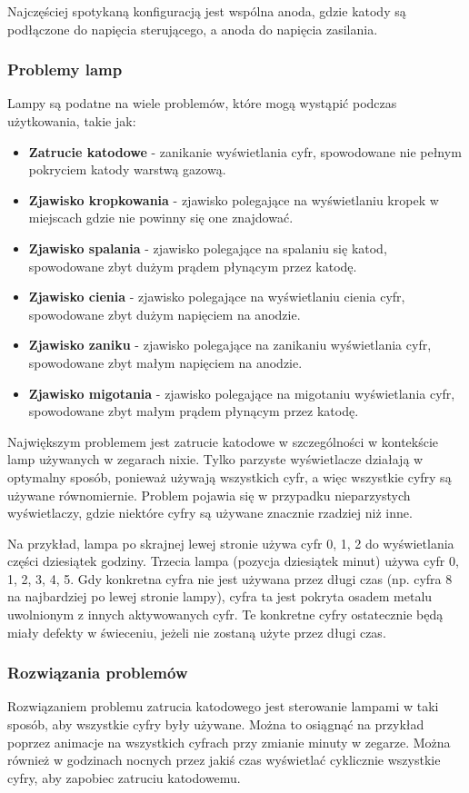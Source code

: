 \documentclass[../main.tex]{subfiles}
\begin{document}
Najczęściej spotykaną konfiguracją jest wspólna anoda, gdzie katody są podłączone do napięcia sterującego, a anoda do napięcia zasilania.

\subsubsection{Problemy lamp}

Lampy są podatne na wiele problemów, które mogą wystąpić podczas użytkowania, takie jak:
\begin{itemize}
  \item \textbf{Zatrucie katodowe} - zanikanie wyświetlania cyfr, spowodowane nie pełnym pokryciem katody warstwą gazową.
  \item \textbf{Zjawisko kropkowania} - zjawisko polegające na wyświetlaniu kropek w miejscach gdzie nie powinny się one znajdować.
  \item \textbf{Zjawisko spalania} - zjawisko polegające na spalaniu się katod, spowodowane zbyt dużym prądem płynącym przez katodę.
  \item \textbf{Zjawisko cienia} - zjawisko polegające na wyświetlaniu cienia cyfr, spowodowane zbyt dużym napięciem na anodzie.
  \item \textbf{Zjawisko zaniku} - zjawisko polegające na zanikaniu wyświetlania cyfr, spowodowane zbyt małym napięciem na anodzie.
  \item \textbf{Zjawisko migotania} - zjawisko polegające na migotaniu wyświetlania cyfr, spowodowane zbyt małym prądem płynącym przez katodę.
\end{itemize}

Największym problemem jest zatrucie katodowe w szczególności w kontekście lamp używanych w zegarach nixie. 
Tylko parzyste wyświetlacze działają w optymalny sposób, ponieważ używają wszystkich cyfr, a więc wszystkie cyfry są używane równomiernie.
Problem pojawia się w przypadku nieparzystych wyświetlaczy, gdzie niektóre cyfry są używane znacznie rzadziej niż inne.

Na przykład, lampa po skrajnej lewej stronie używa cyfr 0, 1, 2 do wyświetlania części dziesiątek godziny.
Trzecia lampa (pozycja dziesiątek minut) używa cyfr 0, 1, 2, 3, 4, 5. Gdy konkretna cyfra nie jest używana przez długi czas (np. cyfra 8 na najbardziej po lewej stronie lampy),
cyfra ta jest pokryta osadem metalu uwolnionym z innych aktywowanych cyfr. Te konkretne cyfry ostatecznie będą miały defekty w świeceniu, jeżeli nie zostaną użyte przez długi czas.

\subsubsection{Rozwiązania problemów}
Rozwiązaniem problemu zatrucia katodowego jest sterowanie lampami w taki sposób, aby wszystkie cyfry były używane.
Można to osiągnąć na przykład poprzez animacje na wszystkich cyfrach przy zmianie minuty w zegarze.
Można również w godzinach nocnych przez jakiś czas wyświetlać cyklicznie wszystkie cyfry, aby zapobiec zatruciu katodowemu.
\end{document}

